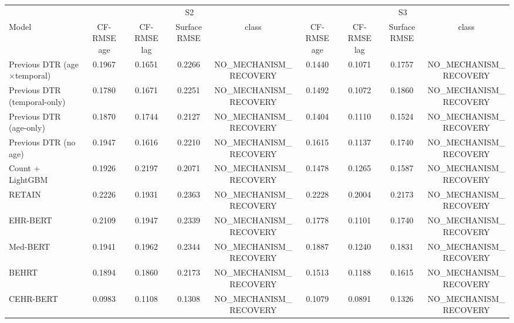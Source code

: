 \begin{tabular}{lcccc cccc}
\toprule
 & \multicolumn{4}{c}{S2} & \multicolumn{4}{c}{S3} \\
Model & CF-RMSE age & CF-RMSE lag & Surface RMSE & class & CF-RMSE age & CF-RMSE lag & Surface RMSE & class \\
\midrule
Previous DTR (age$\times$temporal) & 0.1967 & 0.1651 & 0.2266 & NO\_MECHANISM\_RECOVERY & 0.1440 & 0.1071 & 0.1757 & NO\_MECHANISM\_RECOVERY \\
Previous DTR (temporal-only) & 0.1780 & 0.1671 & 0.2251 & NO\_MECHANISM\_RECOVERY & 0.1492 & 0.1072 & 0.1860 & NO\_MECHANISM\_RECOVERY \\
Previous DTR (age-only) & 0.1870 & 0.1744 & 0.2127 & NO\_MECHANISM\_RECOVERY & 0.1404 & 0.1110 & 0.1524 & NO\_MECHANISM\_RECOVERY \\
Previous DTR (no age) & 0.1947 & 0.1616 & 0.2210 & NO\_MECHANISM\_RECOVERY & 0.1615 & 0.1137 & 0.1740 & NO\_MECHANISM\_RECOVERY \\
Count + LightGBM & 0.1926 & 0.2197 & 0.2071 & NO\_MECHANISM\_RECOVERY & 0.1478 & 0.1265 & 0.1587 & NO\_MECHANISM\_RECOVERY \\
RETAIN & 0.2226 & 0.1931 & 0.2363 & NO\_MECHANISM\_RECOVERY & 0.2228 & 0.2004 & 0.2173 & NO\_MECHANISM\_RECOVERY \\
EHR-BERT & 0.2109 & 0.1947 & 0.2339 & NO\_MECHANISM\_RECOVERY & 0.1778 & 0.1101 & 0.1740 & NO\_MECHANISM\_RECOVERY \\
Med-BERT & 0.1941 & 0.1962 & 0.2344 & NO\_MECHANISM\_RECOVERY & 0.1887 & 0.1240 & 0.1831 & NO\_MECHANISM\_RECOVERY \\
BEHRT & 0.1894 & 0.1860 & 0.2173 & NO\_MECHANISM\_RECOVERY & 0.1513 & 0.1188 & 0.1615 & NO\_MECHANISM\_RECOVERY \\
CEHR-BERT & 0.0983 & 0.1108 & 0.1308 & NO\_MECHANISM\_RECOVERY & 0.1079 & 0.0891 & 0.1326 & NO\_MECHANISM\_RECOVERY \\
\bottomrule
\end{tabular}
